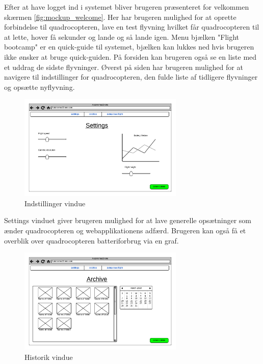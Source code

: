 Efter at have logget ind i systemet bliver brugeren præsenteret for velkommen skærmen \ref{fig:mockup_welcome}. Her har brugeren mulighed for at oprette forbindelse til quadrocopteren, lave en test flyvning hvilket får quadrocopteren til at lette, hover få sekunder og lande og så lande igen. Menu bjælken "Flight bootcamp" er en quick-guide til systemet, bjælken kan lukkes ned hvis brugeren ikke ønsker at bruge quick-guiden. På forsiden kan brugeren også se en liste med et uddrag de sidste flyvninger. Øverst på siden har brugeren mulighed for at navigere til indstillinger for quadrocopteren, den fulde liste af tidligere flyvninger og opsætte nyflyvning. \newpage

\vspace{-5pt}
\begin{figure}[H]
	\centering
	\includegraphics[width=0.7\textwidth]{Billeder/UI_mockups/settings.png}
	\vspace{-5pt}
	\caption{Indstillinger vindue}
	\label{fig:mockup_settings}
\end{figure}

Settings vinduet giver brugeren mulighed for at lave generelle opsætninger som ænder quadrocopteren og webapplikationens adfærd. Brugeren kan også få et overblik over quadrocopteren batteriforbrug via en graf.

\vspace{-5pt}
\begin{figure}[H]
	\centering
	\includegraphics[width=0.7\textwidth]{Billeder/UI_mockups/archive.png}
	\vspace{-5pt}
	\caption{Historik vindue}
	\label{fig:mockup_archive}
\end{figure}

